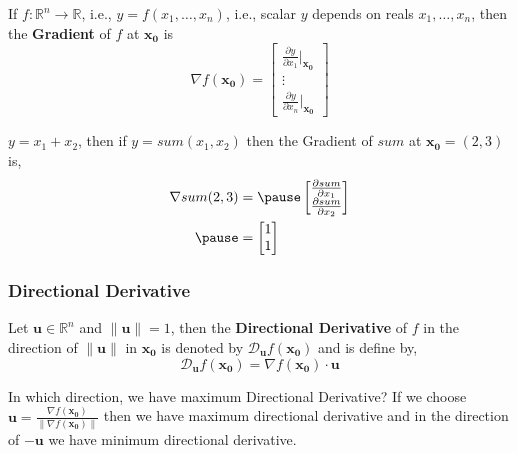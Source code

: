 \documentclass[12pt,aspectratio=169]{beamer}
\renewcommand{\Re}{\mathbb{R}}
\newcommand{\at}[2][]{#1|_{#2}}
\begin{document}
\begin{frame}
If $f:\Re^n\to \Re$, i.e., $y=f(x_1,\dots,x_n)$, i.e., scalar $y$ depends on reals $x_1, \dots, x_n$, then the \textbf{Gradient} of $f$ at $\mathbf{x_0}$ is \pause
\[
\nabla f(\mathbf{x_0})=
\begin{bmatrix}
\frac{\partial y}{\partial x_1}\at[\big]{\mathbf{x_0}}\\
\vdots \\
\frac{\partial y}{\partial x_n}\at[\big]{\mathbf{x_0}}
\end{bmatrix}
\] 
\end{frame}

\begin{frame}
$y=x_1+x_2$, then if $y=sum(x_1,x_2)$ then the Gradient of $sum$ at $\mathbf{x_0}=(2,3)$ is, \pause
\[
\begin{aligned}
\nabla sum(2,3)&= \pause \begin{bmatrix}
\frac{\partial sum}{\partial x_1}\\
\frac{\partial sum}{\partial x_2}
\end{bmatrix} \\ \pause
& =\begin{bmatrix}
1\\
1
\end{bmatrix}
\end{aligned}
\]
\end{frame}

\begin{frame}
\frametitle{Directional Derivative}
Let $\mathbf{u}\in \Re^n$ and $\|\mathbf{u}\|=1$, then the \textbf{Directional Derivative} of $f$ in the direction of $\|\mathbf{u}\|$ in $\mathbf{x_0}$ is denoted by $\mathcal{D}_{\mathbf{u}}f(\mathbf{x_0})$ and is define by,\pause
\[
\mathcal{D}_{\mathbf{u}}f(\mathbf{x_0})=\nabla f(\mathbf{x_0})\cdot \mathbf{u}
\]
\end{frame}

\begin{frame}
In which direction, we have maximum Directional Derivative? \pause
If we choose $\mathbf{u}=\frac{\nabla f(\mathbf{x_0})}{\|\nabla f(\mathbf{x_0})\|}$ then we have maximum directional derivative and \pause in the direction of $-\mathbf{u}$ we have minimum directional derivative.
\end{frame}
\end{document}
